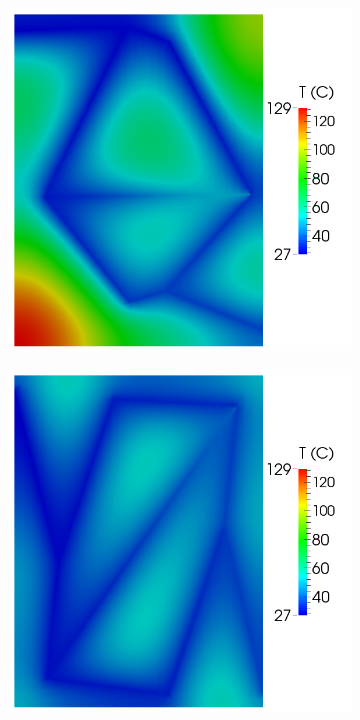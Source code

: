 \documentclass[11pt,letterpaper]{article}
\begin{document}
\begin{figure}[!h]
\centering
\begin{subfigure}{0.35\textwidth}
\includegraphics[width=\linewidth]{parallelTwo_T_0.png}
\caption{}
\end{subfigure}
\begin{subfigure}{0.35\textwidth}
\includegraphics[width=\linewidth]{parallelTwo_T_30.png}
\caption{ }
\end{subfigure}


\end{figure}
\end{document}

